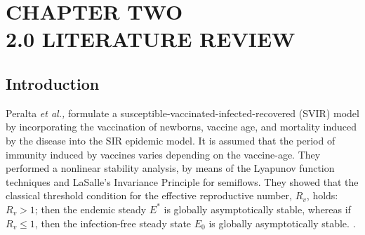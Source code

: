 
\chapter{CHAPTER TWO\\2.0 LITERATURE REVIEW} %

\label{Chapter2} %



\section{Introduction}
Peralta \textit{et al.,} formulate a susceptible-vaccinated-infected-recovered (SVIR) model by incorporating the vaccination of newborns, vaccine age, and mortality induced by the disease into the SIR epidemic model. It is assumed that the period of immunity induced by vaccines varies depending on the vaccine-age. They performed a nonlinear stability analysis, by means of the Lyapunov function techniques and LaSalle's Invariance Principle for semiflows. They showed that the classical threshold condition for the effective reproductive number, $ R_{v} $, holds: $ R_{v} > 1 $; then the endemic steady $ E^{*} $ is globally asymptotically stable, whereas if $ R_{v} \leq 1$, then the infection-free steady state $ E_{0} $ is globally asymptotically stable. \parencite{peralta2015global}.

